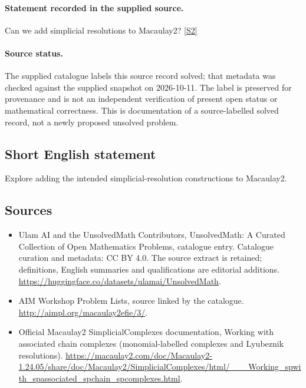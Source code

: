 \documentclass[11pt]{article}
\newcommand{\sref}[2]{\hyperlink{source:#1:#2}{[S#2]}}
\begin{document}
\paragraph{Statement recorded in the supplied source.}
Can we add simplicial resolutions to Macaulay2? \sref{statement}{2}
\paragraph{Source status.}
The supplied catalogue labels this source record solved; that metadata was checked against the supplied snapshot on 2026-10-11. The label is preserved for provenance and is not an independent verification of present open status or mathematical correctness. This is documentation of a source-labelled solved record, not a newly proposed unsolved problem.
\subsection{Short English statement}
Explore adding the intended simplicial-resolution constructions to Macaulay2.
\subsection{Sources}
\begin{itemize}
\item[\hypertarget{source:statement:1}{S1}] Ulam AI and the UnsolvedMath Contributors, UnsolvedMath: A Curated Collection of Open Mathematics Problems, catalogue entry. Catalogue curation and metadata: CC BY 4.0. The source extract is retained; definitions, English summaries and qualifications are editorial additions.
\url{https://huggingface.co/datasets/ulamai/UnsolvedMath}.
\item[\hypertarget{source:statement:2}{S2}] AIM Workshop Problem Lists, source linked by the catalogue.
\url{http://aimpl.org/macaulay2efie/3/}.
\item[\hypertarget{source:statement:3}{S3}] Official Macaulay2 SimplicialComplexes documentation, Working with associated chain complexes (monomial-labelled complexes and Lyubeznik resolutions).
\url{https://macaulay2.com/doc/Macaulay2-1.24.05/share/doc/Macaulay2/SimplicialComplexes/html/___Working_spwith_spassociated_spchain_spcomplexes.html}.
\end{itemize}
\end{document}
